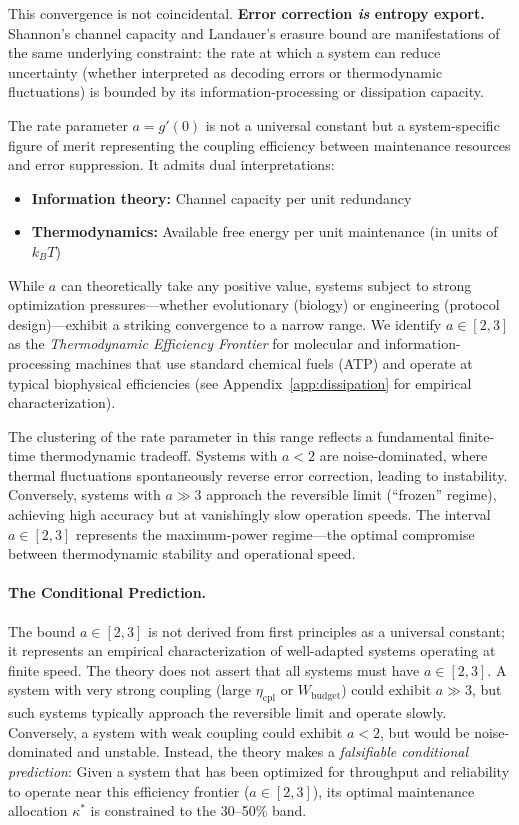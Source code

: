 \documentclass[11pt,twocolumn]{article}
\begin{document}
This convergence is not coincidental. \textbf{Error correction \emph{is} entropy export.} Shannon's channel capacity and Landauer's erasure bound are manifestations of the same underlying constraint: the rate at which a system can reduce uncertainty (whether interpreted as decoding errors or thermodynamic fluctuations) is bounded by its information-processing or dissipation capacity.

The rate parameter $a = g'(0)$ is not a universal constant but a system-specific figure of merit representing the coupling efficiency between maintenance resources and error suppression. It admits dual interpretations:
\begin{itemize}[leftmargin=*,itemsep=2pt]
    \item \textbf{Information theory:} Channel capacity per unit redundancy
    \item \textbf{Thermodynamics:} Available free energy per unit maintenance (in units of $k_B T$)
\end{itemize}

While $a$ can theoretically take any positive value, systems subject to strong optimization pressures---whether evolutionary (biology) or engineering (protocol design)---exhibit a striking convergence to a narrow range. We identify $a \in [2, 3]$ as the \emph{Thermodynamic Efficiency Frontier} for molecular and information-processing machines that use standard chemical fuels (ATP) and operate at typical biophysical efficiencies (see Appendix~\ref{app:dissipation} for empirical characterization).

The clustering of the rate parameter in this range reflects a fundamental finite-time thermodynamic tradeoff. Systems with $a < 2$ are noise-dominated, where thermal fluctuations spontaneously reverse error correction, leading to instability. Conversely, systems with $a \gg 3$ approach the reversible limit (``frozen'' regime), achieving high accuracy but at vanishingly slow operation speeds. The interval $a \in [2, 3]$ represents the maximum-power regime---the optimal compromise between thermodynamic stability and operational speed.

\paragraph{The Conditional Prediction.} The bound $a \in [2, 3]$ is not derived from first principles as a universal constant; it represents an empirical characterization of well-adapted systems operating at finite speed. The theory does not assert that all systems must have $a \in [2, 3]$. A system with very strong coupling (large $\eta_{\mathrm{cpl}}$ or $W_{\mathrm{budget}}$) could exhibit $a \gg 3$, but such systems typically approach the reversible limit and operate slowly. Conversely, a system with weak coupling could exhibit $a < 2$, but would be noise-dominated and unstable. Instead, the theory makes a \emph{falsifiable conditional prediction}: Given a system that has been optimized for throughput and reliability to operate near this efficiency frontier ($a \in [2, 3]$), its optimal maintenance allocation $\kappa^*$ is constrained to the 30--50\% band.
\end{document}
